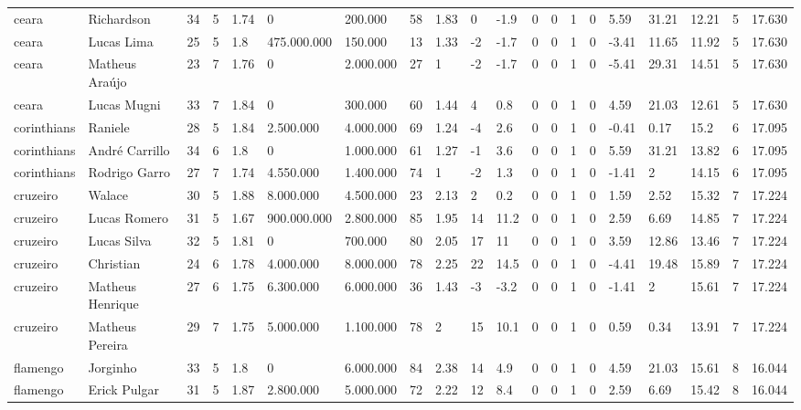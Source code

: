 \begin{longtable}{llllllllllllllllllll}
ceara & Richardson & 34 & 5 & 1.74 & 0 & 200.000 & 58 & 1.83 & 0 & -1.9 & 0 & 0 & 1 & 0 & 5.59 & 31.21 & 12.21 & 5 & 17.630 \\
ceara & Lucas Lima & 25 & 5 & 1.8 & 475.000.000 & 150.000 & 13 & 1.33 & -2 & -1.7 & 0 & 0 & 1 & 0 & -3.41 & 11.65 & 11.92 & 5 & 17.630 \\
ceara & Matheus Araújo & 23 & 7 & 1.76 & 0 & 2.000.000 & 27 & 1 & -2 & -1.7 & 0 & 0 & 1 & 0 & -5.41 & 29.31 & 14.51 & 5 & 17.630 \\
ceara & Lucas Mugni & 33 & 7 & 1.84 & 0 & 300.000 & 60 & 1.44 & 4 & 0.8 & 0 & 0 & 1 & 0 & 4.59 & 21.03 & 12.61 & 5 & 17.630 \\
corinthians & Raniele & 28 & 5 & 1.84 & 2.500.000 & 4.000.000 & 69 & 1.24 & -4 & 2.6 & 0 & 0 & 1 & 0 & -0.41 & 0.17 & 15.2 & 6 & 17.095 \\
corinthians & André Carrillo & 34 & 6 & 1.8 & 0 & 1.000.000 & 61 & 1.27 & -1 & 3.6 & 0 & 0 & 1 & 0 & 5.59 & 31.21 & 13.82 & 6 & 17.095 \\
corinthians & Rodrigo Garro & 27 & 7 & 1.74 & 4.550.000 & 1.400.000 & 74 & 1 & -2 & 1.3 & 0 & 0 & 1 & 0 & -1.41 & 2 & 14.15 & 6 & 17.095 \\
cruzeiro & Walace & 30 & 5 & 1.88 & 8.000.000 & 4.500.000 & 23 & 2.13 & 2 & 0.2 & 0 & 0 & 1 & 0 & 1.59 & 2.52 & 15.32 & 7 & 17.224 \\
cruzeiro & Lucas Romero & 31 & 5 & 1.67 & 900.000.000 & 2.800.000 & 85 & 1.95 & 14 & 11.2 & 0 & 0 & 1 & 0 & 2.59 & 6.69 & 14.85 & 7 & 17.224 \\
cruzeiro & Lucas Silva & 32 & 5 & 1.81 & 0 & 700.000 & 80 & 2.05 & 17 & 11 & 0 & 0 & 1 & 0 & 3.59 & 12.86 & 13.46 & 7 & 17.224 \\
cruzeiro & Christian & 24 & 6 & 1.78 & 4.000.000 & 8.000.000 & 78 & 2.25 & 22 & 14.5 & 0 & 0 & 1 & 0 & -4.41 & 19.48 & 15.89 & 7 & 17.224 \\
cruzeiro & Matheus Henrique & 27 & 6 & 1.75 & 6.300.000 & 6.000.000 & 36 & 1.43 & -3 & -3.2 & 0 & 0 & 1 & 0 & -1.41 & 2 & 15.61 & 7 & 17.224 \\
cruzeiro & Matheus Pereira & 29 & 7 & 1.75 & 5.000.000 & 1.100.000 & 78 & 2 & 15 & 10.1 & 0 & 0 & 1 & 0 & 0.59 & 0.34 & 13.91 & 7 & 17.224 \\
flamengo & Jorginho & 33 & 5 & 1.8 & 0 & 6.000.000 & 84 & 2.38 & 14 & 4.9 & 0 & 0 & 1 & 0 & 4.59 & 21.03 & 15.61 & 8 & 16.044 \\
flamengo & Erick Pulgar & 31 & 5 & 1.87 & 2.800.000 & 5.000.000 & 72 & 2.22 & 12 & 8.4 & 0 & 0 & 1 & 0 & 2.59 & 6.69 & 15.42 & 8 & 16.044 \\

\end{longtable}
